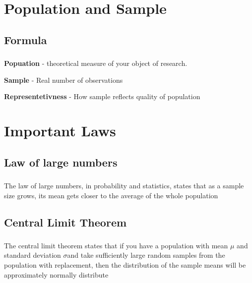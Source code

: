 \documentclass[t, 11pt]{beamer}
\begin{document}
\section{Population and  Sample}
\subsection{Formula}
\begin{frame} 
	\frametitle{\insertsection} 
	\framesubtitle{\insertsubsection}
\textbf{Popuation} - theoretical measure of your object of research.  

\vspace{1cm}

\textbf{Sample} - Real number of observations

\vspace{1cm}

\textbf{Representetivness} - How sample reflects quality of population 

\end{frame}	

\section{Important Laws}

\subsection{Law of large numbers}
\begin{frame} 
	\frametitle{\insertsection} 
	\framesubtitle{\insertsubsection}
	
	The law of large numbers, in probability and statistics, states that as a sample size grows, its mean gets closer to the average of the whole population
	
\end{frame}	



\subsection{Central Limit Theorem}
\begin{frame} 
	\frametitle{\insertsection} 
	\framesubtitle{\insertsubsection}
	
	The central limit theorem states that if you have a population with mean $\mu$ and standard deviation $\sigma$and take sufficiently large random samples from the population with replacement, then the distribution of the sample means will be approximately normally distribute
	
\end{frame}	




\end{document}

